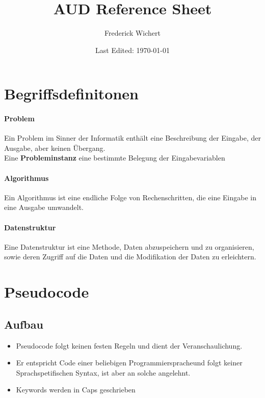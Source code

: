 


\begin{titlepage}
  \title{AUD Reference Sheet} %
  \author{Frederick Wichert}
  \date{Last Edited: \today}
\end{titlepage}



	\maketitle
	
	\setcounter{secnumdepth}{2}
	\setcounter{tocdepth}{2}
	\tableofcontents
	
	\newpage




\section{Begriffsdefinitonen}%
	\paragraph{Problem}
	Ein Problem im Sinner der Informatik enthält eine Beschreibung der Eingabe, der Ausgabe, aber keinen Übergang. \\
	Eine \textbf{Probleminstanz} eine bestimmte Belegung der Eingabevariablen

	\paragraph{Algorithmus}
	Ein Algorithmus ist eine endliche Folge von Rechenschritten, die eine Eingabe in eine Ausgabe umwandelt.

	\paragraph{Datenstruktur}
	Eine Datenstruktur ist eine Methode, Daten abzuspeichern und zu organisieren, sowie deren Zugriff auf die Daten und die Modifikation der Daten zu erleichtern.



\vspace{1.5cm}
\section{Pseudocode} %
	\subsection{Aufbau}
	\begin{itemize}
		\item Pseudocode folgt keinen festen Regeln und dient der Veranschaulichung.
		\item Er entspricht Code einer beliebigen Programmierspracheund folgt keiner Sprachspetifischen Syntax, ist aber an solche angelehnt. 
		\item Keywords werden in Caps geschrieben 
	\end{itemize} 

